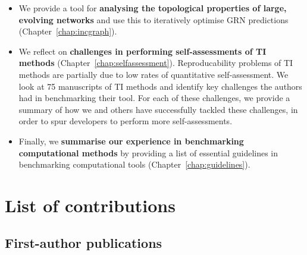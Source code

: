 \begin{itemize}
	\item We provide a tool for  \textbf{analysing the topological properties of large, evolving networks} and use this to iteratively optimise GRN predictions (Chapter~\ref{chap:incgraph}).
	\item We reflect on \textbf{challenges in performing self-assessments of TI methods} (Chapter~\ref{chap:selfassessment}).
	Reproducability problems of TI methods are partially due to low rates of quantitative self-assessment. We look at 75 manuscripts of TI methods and identify key challenges the authors had in benchmarking their tool. For each of these challenges, we provide a summary of how we and others have successfully tackled these challenges, in order to spur developers to perform more self-assessments.
	\item Finally, we \textbf{summarise our experience in benchmarking computational methods} by providing a list of essential guidelines in benchmarking computational tools (Chapter~\ref{chap:guidelines}).
\end{itemize}


\section{List of contributions}
\subsection{First-author publications}

